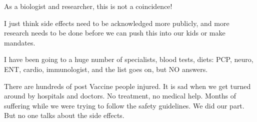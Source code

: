 {As a biologist and researcher, this is not a coincidence!

I just think side effects need to be acknowledged more publicly, and more
research needs to be done before we can push this into our kids or make
mandates.

I have been going to a huge number of specialists, blood tests, diets: PCP,
neuro, ENT, cardio, immunologist, and the list goes on, but NO answers.

There are hundreds of post Vaccine people injured. It is sad when we get turned
around by hospitals and doctors. No treatment, no medical help. Months of
suffering while we were trying to follow the safety guidelines. We did our
part. But no one talks about the side effects.

}
